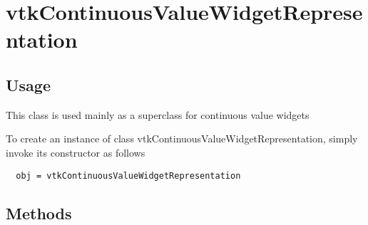 \section{vtkContinuousValueWidgetRepresentation}

\subsection{Usage}

 This class is used mainly as a superclass for continuous value widgets


To create an instance of class vtkContinuousValueWidgetRepresentation, simply
invoke its constructor as follows
\begin{verbatim}
  obj = vtkContinuousValueWidgetRepresentation
\end{verbatim}
\subsection{Methods}

